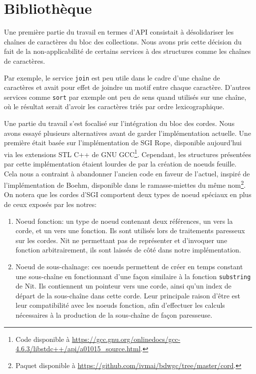 \section{Bibliothèque}

Une première partie du travail en termes d'API consistait à désolidariser les chaînes de caractères
du bloc des collections.
Nous avons pris cette décision du fait de la non-applicabilité de certains services
à des structures comme les chaînes de caractères.

Par exemple, le service \texttt{join} est peu utile dans le cadre d'une chaîne de caractères et avait pour effet
de joindre un motif entre chaque caractère.
D'autres services comme \texttt{sort} par exemple ont peu de sens quand utilisés sur une chaîne,
où le résultat serait d'avoir les caractères triés par ordre lexicographique.

Une partie du travail s'est focalisé sur l'intégration du bloc des cordes.
Nous avons essayé plusieurs alternatives avant de garder l'implémentation actuelle.
Une première était basée sur l'implémentation de SGI Rope, disponible aujourd'hui via les extensions
STL C++ de GNU GCC\footnote{Code disponible à \url{https://gcc.gnu.org/onlinedocs/gcc-4.6.3/libstdc++/api/a01015_source.html}.}.
Cependant, les structures présentées par cette implémentation étaient lourdes de par la création de noeuds
feuille.
Cela nous a contraint à abandonner l'ancien code en faveur de l'actuel, inspiré
de l'implémentation de Boehm, disponible dans le ramasse-miettes du même
nom\footnote{Paquet disponible à \url{https://github.com/ivmai/bdwgc/tree/master/cord}.}.
On notera que les cordes d'SGI comportent deux types de noeud spéciaux en plus de ceux exposés par les notres:

\begin{enumerate}
	\item Noeud fonction: un type de noeud contenant deux références, un vers la corde, et un vers une fonction.
		Ils sont utilisés lors de traitements paresseux sur les cordes. Nit ne permettant pas de représenter et
		d'invoquer une fonction arbitrairement, ils sont laissés de côté dans notre implémentation.
	\item Noeud de sous-chaînage: ces noeuds permettent de créer en temps constant une sous-chaîne en fonctionnant
		d'une façon similaire à la fonction \texttt{substring} de Nit.
		Ils contiennent un pointeur vers une corde, ainsi qu'un index de départ de la sous-chaîne dans cette corde.
		Leur principale raison d'être est leur compatibilité avec les noeuds fonction, afin
		d'effectuer les calculs nécessaires à la production de la sous-chaîne de façon paresseuse.
\end{enumerate}

